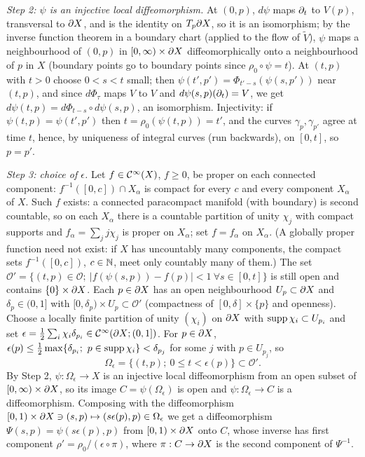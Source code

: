 \emph{Step 2: $\psi$ is an injective local diffeomorphism.} At $(0,p)$, $d\psi$ maps
$\partial_t$ to $V(p)$, transversal to $\partial X$, and is the identity on $T_p\partial X$, so it is an
isomorphism; by the inverse function theorem in a boundary chart (applied to the flow of
$\tilde V$), $\psi$ maps a neighbourhood of $(0,p)$ in $[0,\infty)\times\partial X$
diffeomorphically onto a neighbourhood of $p$ in $X$ (boundary points go to boundary
points since $\rho_0\circ\psi=t$). At $(t,p)$ with $t>0$ choose $0<s<t$ small; then
$\psi(t',p')=\Phi_{t'-s}(\psi(s,p'))$ near $(t,p)$, and since $d\Phi_\tau$ maps $V$ to $V$
and $d\psi(s,p)(\partial_t)=V$, we get $d\psi(t,p)=d\Phi_{t-s}\circ d\psi(s,p)$, an isomorphism.
Injectivity: if $\psi(t,p)=\psi(t',p')$ then $t=\rho_0(\psi(t,p))=t'$, and the curves
$\gamma_p,\gamma_{p'}$ agree at time $t$, hence, by uniqueness of integral curves
(run backwards), on $[0,t]$, so $p=p'$.

\emph{Step 3: choice of $\epsilon$.} Let $f\in\mathcal{C}^\infty(X)$, $f\ge0$, be proper on each
connected component: $f^{-1}([0,c])\cap X_\alpha$ is compact for every $c$ and every
component $X_\alpha$ of $X$. Such $f$ exists: a connected paracompact manifold (with
boundary) is second countable, so on each $X_\alpha$ there is a countable partition of
unity $\chi_j$ with compact supports and $f_\alpha=\sum_jj\chi_j$ is proper on $X_\alpha$;
set $f=f_\alpha$ on $X_\alpha$. (A globally proper function need not exist: if $X$ has
uncountably many components, the compact sets $f^{-1}([0,c])$, $c\in\mathbb{N}$, meet only
countably many of them.) The set $\mathcal O'=\{(t,p)\in\mathcal O;\ |f(\psi(s,p))-f(p)|<1\ \forall
s\in[0,t]\}$ is still open and contains $\{0\}\times\partial X$. Each $p\in\partial X$ has an open
neighbourhood $U_p\subset\partial X$ and $\delta_p\in(0,1]$ with $[0,\delta_p)\times U_p
\subset\mathcal O'$ (compactness of $[0,\delta]\times\{p\}$ and openness). Choose a locally
finite partition of unity $(\chi_i)$ on $\partial X$ with $\operatorname{supp}\chi_i\subset U_{p_i}$ and set
$\epsilon=\frac12\sum_i\chi_i\delta_{p_i}\in\mathcal{C}^\infty(\partial X;(0,1])$. For $p\in\partial X$,
$\epsilon(p)\le\frac12\max\{\delta_{p_i};\ p\in\supp\chi_i\}<\delta_{p_j}$ for some $j$
with $p\in U_{p_j}$, so
\begin{equation*}
\Omega_\epsilon=\{(t,p);\ 0\le t<\epsilon(p)\}\subset\mathcal O' .
\end{equation*}
By Step 2, $\psi:\Omega_\epsilon\to X$ is an injective local diffeomorphism from an open
subset of $[0,\infty)\times\partial X$, so its image $C=\psi(\Omega_\epsilon)$ is open and
$\psi:\Omega_\epsilon\to C$ is a diffeomorphism. Composing with the diffeomorphism
$[0,1)\times\partial X\ni(s,p)\mapsto(s\epsilon(p),p)\in\Omega_\epsilon$ we get a
diffeomorphism $\Psi(s,p)=\psi(s\epsilon(p),p)$ from $[0,1)\times\partial X$ onto $C$, whose
inverse has first component $\rho'=\rho_0/(\epsilon\circ\pi)$, where $\pi:C\to\partial X$ is
the second component of $\Psi^{-1}$.

